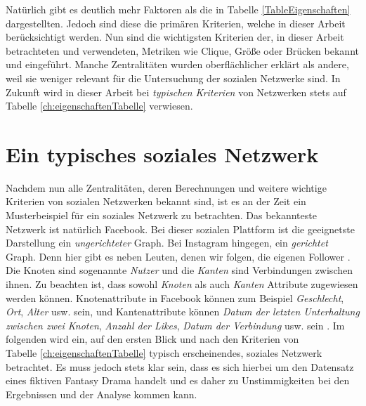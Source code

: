 \begin{table}[h!]
\begin{tabular}{lcc}
  \\\bottomrule
 \end{tabular}
 \end{table}
Natürlich gibt es deutlich mehr Faktoren als die in Tabelle \ref{TableEigenschaften} dargestellten. Jedoch sind diese die primären Kriterien, welche in dieser Arbeit berücksichtigt werden.
Nun sind die wichtigsten Kriterien der, in dieser Arbeit betrachteten und verwendeten, Metriken wie Clique, Größe oder Brücken bekannt und eingeführt. Manche Zentralitäten wurden oberflächlicher erklärt als andere, weil sie weniger relevant für die Untersuchung der sozialen Netzwerke sind. In Zukunft wird in dieser Arbeit bei \textit{typischen Kriterien} von Netzwerken stets auf Tabelle \ref{ch:eigenschaftenTabelle} verwiesen.

\newpage
\section{Ein typisches soziales Netzwerk}
Nachdem nun alle Zentralitäten, deren Berechnungen und weitere wichtige Kriterien von sozialen Netzwerken bekannt sind, ist es an der Zeit ein Musterbeispiel für ein soziales Netzwerk zu betrachten. Das bekannteste Netzwerk ist natürlich Facebook. Bei dieser sozialen Plattform ist die geeignetste Darstellung ein \textit{ungerichteter} Graph. Bei Instagram hingegen, ein \textit{gerichtet} Graph. Denn hier gibt es neben Leuten, denen wir folgen, die eigenen Follower \cite{fbInsta}. Die Knoten sind sogenannte \textit{Nutzer} und die \textit{Kanten} sind Verbindungen zwischen ihnen. Zu beachten ist, dass sowohl \textit{Knoten} als auch \textit{Kanten} Attribute zugewiesen werden können. Knotenattribute in Facebook können zum Beispiel \textit{Geschlecht}, \textit{Ort}, \textit{Alter} usw. sein, und Kantenattribute können \textit{Datum der letzten Unterhaltung zwischen zwei Knoten}, \textit{Anzahl der Likes}, \textit{Datum der Verbindung} usw. sein \cite{GOT}.
Im folgenden wird ein, auf den ersten Blick und nach den Kriterien von \\ 
Tabelle \ref{ch:eigenschaftenTabelle} typisch erscheinendes, soziales Netzwerk betrachtet. Es muss jedoch stets klar sein, dass es sich hierbei um den Datensatz eines fiktiven Fantasy Drama handelt \cite{GOT} und es daher zu Unstimmigkeiten bei den Ergebnissen und der Analyse kommen kann.

